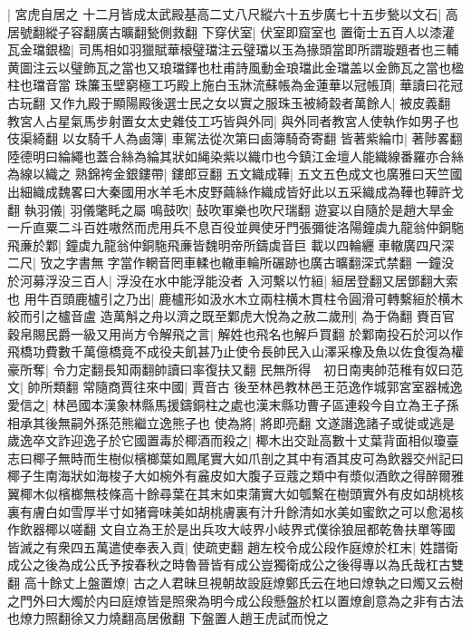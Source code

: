|{
	宮虎自居之}
十二月皆成太武殿基高二丈八尺縱六十五步廣七十五步甃以文石|{
	高居號翻縱子容翻廣古曠翻甃側救翻}
下穿伏室|{
	伏室即窟室也}
置衛士五百人以漆灌瓦金璫銀楹|{
	司馬相如羽獵賦華榱璧璫注云璧璫以玉為掾頭當即所謂璇題者也三輔黄圖注云以璧飾瓦之當也又琅璫鐸也杜甫詩風動金琅璫此金璫盖以金飾瓦之當也楹柱也璫音當}
珠簾玉壁窮極工巧殿上施白玉牀流蘇帳為金蓮華以冠帳頂|{
	華讀曰花冠古玩翻}
又作九殿于顯陽殿後選士民之女以實之服珠玉被綺縠者萬餘人|{
	被皮義翻}
教宮人占星氣馬步射置女太史雜伎工巧皆與外同|{
	與外同者教宮人使執作如男子也伎渠綺翻}
以女騎千人為鹵簿|{
	車駕法從次第曰鹵簿騎奇寄翻}
皆著紫綸巾|{
	著陟畧翻陸德明曰綸繩也蓋合絲為綸其狀如䋲染紫以織巾也今鎮江金壇人能織線番羅亦合絲為線以織之}
熟錦袴金銀鏤帶|{
	鏤郎豆翻}
五文織成鞾|{
	五文五色成文也廣雅曰天竺國出細織成魏畧曰大秦國用水羊毛木皮野繭絲作織成皆好此以五采織成為鞾也鞾許戈翻}
執羽儀|{
	羽儀氅眊之屬}
鳴鼓吹|{
	鼔吹軍樂也吹尺瑞翻}
遊宴以自隨於是趙大旱金一斤直粟二斗百姓嗷然而虎用兵不息百役並興使牙門張彌徙洛陽鐘虡九龍翁仲銅駞飛亷於鄴|{
	鐘虡九龍翁仲銅駞飛亷皆魏明帝所鑄虡音巨}
載以四輪纒車轍廣四尺深二尺|{
	攷之字書無字當作輞音罔車輮也轍車輪所碾跡也廣古曠翻深式禁翻}
一鐘没於河募浮没三百人|{
	浮没在水中能浮能没者}
入河繫以竹絙|{
	絙居登翻又居鄧翻大索也}
用牛百頭鹿櫨引之乃出|{
	鹿櫨形如汲水木立兩柱横木貫柱令圓滑可轉繫絙於横木絞而引之櫨音盧}
造萬斛之舟以濟之既至鄴虎大悅為之赦二歲刑|{
	為于偽翻}
賚百官穀帛賜民爵一級又用尚方令解飛之言|{
	解姓也飛名也解戶買翻}
於鄴南投石於河以作飛橋功費數千萬億橋竟不成役夫飢甚乃止使令長帥民入山澤采橡及魚以佐食復為權豪所奪|{
	令力定翻長知兩翻帥讀曰率復扶又翻}
民無所得　初日南夷帥范稚有奴曰范文|{
	帥所類翻}
常隨商賈往來中國|{
	賈音古}
後至林邑教林邑王范逸作城郭宮室器械逸愛信之|{
	林邑國本漢象林縣馬援鑄銅柱之處也漢末縣功曹子區連殺今自立為王子孫相承其後無嗣外孫范熊繼立逸熊子也}
使為將|{
	將即亮翻}
文遂譖逸諸子或徙或逃是歲逸卒文詐迎逸子於它國置毒於椰酒而殺之|{
	椰木出交趾高數十丈葉背面相似瓊臺志曰椰子無時而生樹似檳榔葉如鳳尾實大如爪剖之其中有酒其皮可為飲器交州記曰椰子生南海狀如海梭子大如椀外有麄皮如大腹子豆蔻之類中有漿似酒飲之得醉爾雅翼椰木似檳榔無枝條高十餘尋葉在其末如束蒲實大如瓠繫在樹頭實外有皮如胡桃核裏有膚白如雪厚半寸如猪膏味美如胡桃膚裏有汁升餘清如水美如蜜飲之可以愈渴核作飲器椰以嗟翻}
文自立為王於是出兵攻大岐界小岐界式僕徐狼屈都乾魯扶單等國皆滅之有衆四五萬遣使奉表入貢|{
	使疏吏翻}
趙左校令成公段作庭燎於杠末|{
	姓譜衛成公之後為成公氏予按春秋之時魯晉皆有成公豈獨衛成公之後得專以為氏哉杠古雙翻}
高十餘丈上盤置燎|{
	古之人君昧旦視朝故設庭燎鄭氏云在地曰燎執之曰燭又云樹之門外曰大燭於内曰庭燎皆是照衆為明今成公段懸盤於杠以置燎創意為之非有古法也燎力照翻徐又力燒翻高居傲翻}
下盤置人趙王虎試而悅之

